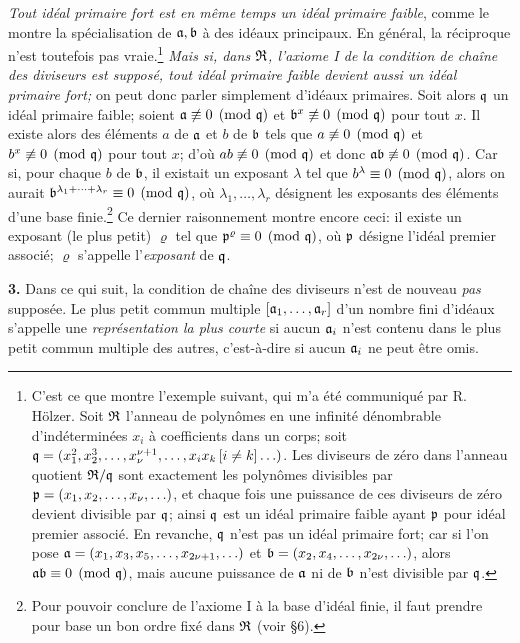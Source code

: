 \emph{Tout idéal primaire fort est en même temps un idéal primaire faible}, comme le montre la spécialisation de $\mathfrak{a},\mathfrak{b}$ à des idéaux principaux. En général, la réciproque n'est toutefois pas vraie.\footnote{C'est ce que montre l'exemple suivant, qui m'a été communiqué par R. Hölzer. Soit $\mathfrak{R}$ l'anneau de polynômes en une infinité dénombrable d'indéterminées $x_i$ à coefficients dans un corps; soit $\mathfrak{q}=(x_1^2,x_2^3,\ldots,x_\nu^{\nu+1},\ldots,x_i x_k\,[i\ne k]\ldots)$. Les diviseurs de zéro dans l'anneau quotient $\mathfrak{R}/\mathfrak{q}$ sont exactement les polynômes divisibles par $\mathfrak{p}=(x_1,x_2,\ldots,x_\nu,\ldots)$, et chaque fois une puissance de ces diviseurs de zéro devient divisible par $\mathfrak{q}$; ainsi $\mathfrak{q}$ est un idéal primaire faible ayant $\mathfrak{p}$ pour idéal premier associé. En revanche, $\mathfrak{q}$ n'est pas un idéal primaire fort; car si l'on pose $\mathfrak{a}=(x_1,x_3,x_5,\ldots,x_{2\nu+1},\ldots)$ et $\mathfrak{b}=(x_2,x_4,\ldots,x_{2\nu},\ldots)$, alors $\mathfrak{a}\mathfrak{b}\equiv0\pmod{\mathfrak{q}}$, mais aucune puissance de $\mathfrak{a}$ ni de $\mathfrak{b}$ n'est divisible par $\mathfrak{q}$.} \emph{Mais si, dans $\mathfrak{R}$, l'axiome I de la condition de chaîne des diviseurs est supposé, tout idéal primaire faible devient aussi un idéal primaire fort;} on peut donc parler simplement d'idéaux primaires. Soit alors $\mathfrak{q}$ un idéal primaire faible; soient $\mathfrak{a}\not\equiv0\pmod{\mathfrak{q}}$ et $\mathfrak{b}^x\not\equiv0\pmod{\mathfrak{q}}$ pour tout $x$. Il existe alors des éléments $a$ de $\mathfrak{a}$ et $b$ de $\mathfrak{b}$ tels que $a\not\equiv0\pmod{\mathfrak{q}}$ et $b^x\not\equiv0\pmod{\mathfrak{q}}$ pour tout $x$; d'où $ab\not\equiv0\pmod{\mathfrak{q}}$ et donc $\mathfrak{a}\mathfrak{b}\not\equiv0\pmod{\mathfrak{q}}$. Car si, pour chaque $b$ de $\mathfrak{b}$, il existait un exposant $\lambda$ tel que $b^\lambda\equiv0\pmod{\mathfrak{q}}$, alors on aurait $\mathfrak{b}^{\lambda_1+\cdots+\lambda_r}\equiv0\pmod{\mathfrak{q}}$, où $\lambda_1,\ldots,\lambda_r$ désignent les exposants des éléments d'une base finie.\footnote{Pour pouvoir conclure de l'axiome I à la base d'idéal finie, il faut prendre pour base un bon ordre fixé dans $\mathfrak{R}$ (voir \S{}6).} Ce dernier raisonnement montre encore ceci: il existe un exposant (le plus petit) $\varrho$ tel que $\mathfrak{p}^\varrho\equiv0\pmod{\mathfrak{q}}$, où $\mathfrak{p}$ désigne l'idéal premier associé; $\varrho$ s'appelle l'\emph{exposant} de $\mathfrak{q}$.

\textbf{3.} Dans ce qui suit, la condition de chaîne des diviseurs n'est de nouveau \emph{pas} supposée. Le plus petit commun multiple $[\mathfrak{a}_1,\ldots,\mathfrak{a}_r]$ d'un nombre fini d'idéaux s'appelle une \emph{représentation la plus courte} si aucun $\mathfrak{a}_i$ n'est contenu dans le plus petit commun multiple des autres, c'est-à-dire si aucun $\mathfrak{a}_i$ ne peut être omis.

